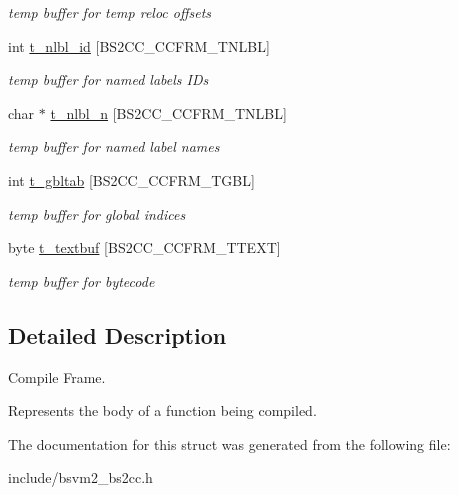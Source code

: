 \begin{DoxyCompactItemize}
\begin{DoxyCompactList}\small\item\em temp buffer for temp reloc offsets \end{DoxyCompactList}\item 
\hypertarget{structBS2CC__CcFrame__s_a525574d5d85db12d321dd0c812b329ad}{int \hyperlink{structBS2CC__CcFrame__s_a525574d5d85db12d321dd0c812b329ad}{t\-\_\-nlbl\-\_\-id} \mbox{[}B\-S2\-C\-C\-\_\-\-C\-C\-F\-R\-M\-\_\-\-T\-N\-L\-B\-L\mbox{]}}\label{structBS2CC__CcFrame__s_a525574d5d85db12d321dd0c812b329ad}

\begin{DoxyCompactList}\small\item\em temp buffer for named labels I\-Ds \end{DoxyCompactList}\item 
\hypertarget{structBS2CC__CcFrame__s_a502577c35248a872a1cc63d58f759fbf}{char $\ast$ \hyperlink{structBS2CC__CcFrame__s_a502577c35248a872a1cc63d58f759fbf}{t\-\_\-nlbl\-\_\-n} \mbox{[}B\-S2\-C\-C\-\_\-\-C\-C\-F\-R\-M\-\_\-\-T\-N\-L\-B\-L\mbox{]}}\label{structBS2CC__CcFrame__s_a502577c35248a872a1cc63d58f759fbf}

\begin{DoxyCompactList}\small\item\em temp buffer for named label names \end{DoxyCompactList}\item 
\hypertarget{structBS2CC__CcFrame__s_a142692ff62f855b34d4a5b046fd7a235}{int \hyperlink{structBS2CC__CcFrame__s_a142692ff62f855b34d4a5b046fd7a235}{t\-\_\-gbltab} \mbox{[}B\-S2\-C\-C\-\_\-\-C\-C\-F\-R\-M\-\_\-\-T\-G\-B\-L\mbox{]}}\label{structBS2CC__CcFrame__s_a142692ff62f855b34d4a5b046fd7a235}

\begin{DoxyCompactList}\small\item\em temp buffer for global indices \end{DoxyCompactList}\item 
\hypertarget{structBS2CC__CcFrame__s_a7894529e455c6aa44dee7c0f2585dade}{byte \hyperlink{structBS2CC__CcFrame__s_a7894529e455c6aa44dee7c0f2585dade}{t\-\_\-textbuf} \mbox{[}B\-S2\-C\-C\-\_\-\-C\-C\-F\-R\-M\-\_\-\-T\-T\-E\-X\-T\mbox{]}}\label{structBS2CC__CcFrame__s_a7894529e455c6aa44dee7c0f2585dade}

\begin{DoxyCompactList}\small\item\em temp buffer for bytecode \end{DoxyCompactList}\end{DoxyCompactItemize}


\subsection{Detailed Description}
Compile Frame.

Represents the body of a function being compiled. 

The documentation for this struct was generated from the following file\-:\begin{DoxyCompactItemize}
\item 
include/bsvm2\-\_\-bs2cc.\-h\end{DoxyCompactItemize}

